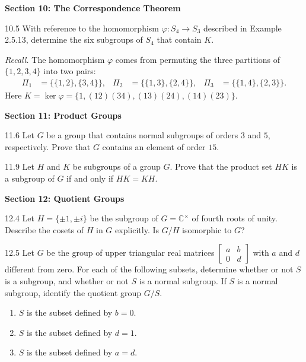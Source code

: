 \documentclass[11pt]{article}
\newcommand{\sectionheading}[1]{%
  \Needspace{8\baselineskip}
  \vspace{0.25em}
  {\color{darkgray}\large\bfseries #1}\par
}
\begin{document}
\newpage
\sectionheading{Section 10: The Correspondence Theorem}

\begin{exercise}{10.5}
With reference to the homomorphism $\varphi\colon S_4\to S_3$ described
in Example 2.5.13, determine the six subgroups of $S_4$ that contain $K$.

\textit{Recall.} The homomorphism $\varphi$ comes from permuting the three
partitions of $\{1,2,3,4\}$ into two pairs:
\[
\begin{aligned}
  \Pi_1&=\bigl\{\{1,2\},\{3,4\}\bigr\},&
  \Pi_2&=\bigl\{\{1,3\},\{2,4\}\bigr\},&
  \Pi_3&=\bigl\{\{1,4\},\{2,3\}\bigr\}.
\end{aligned}
\]
Here $K=\ker\varphi=\{1,(12)(34),(13)(24),(14)(23)\}$.
\end{exercise}

\sectionheading{Section 11: Product Groups}

\begin{exercise}{11.6}
Let $G$ be a group that contains normal subgroups of orders $3$ and $5$,
respectively. Prove that $G$ contains an element of order $15$.
\end{exercise}

\begin{exercise}{11.9}
Let $H$ and $K$ be subgroups of a group $G$. Prove that the product set
$HK$ is a subgroup of $G$ if and only if $HK=KH$.
\end{exercise}

\sectionheading{Section 12: Quotient Groups}

\begin{exercise}{12.4}
Let $H=\{\pm1,\pm i\}$ be the subgroup of $G=\mathbb{C}^{\times}$ of
fourth roots of unity. Describe the cosets of $H$ in $G$ explicitly.
Is $G/H$ isomorphic to $G$?
\end{exercise}

\begin{exercise}{12.5}
Let $G$ be the group of upper triangular real matrices
$\begin{bmatrix}a&b\\0&d\end{bmatrix}$ with $a$ and $d$ different from
zero. For each of the following subsets, determine whether or not $S$ is
a subgroup, and whether or not $S$ is a normal subgroup. If $S$ is a
normal subgroup, identify the quotient group $G/S$.
\begin{enumerate}[label=\textbf{(\roman*)}]
  \item $S$ is the subset defined by $b=0$.
  \item $S$ is the subset defined by $d=1$.
  \item $S$ is the subset defined by $a=d$.
\end{enumerate}
\end{exercise}
\end{document}
